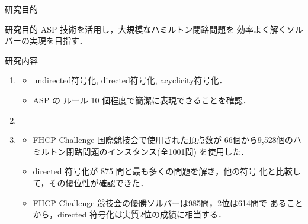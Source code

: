 \documentclass[dvipdfmx,10pt]{beamer}
\begin{document}
\begin{frame}{研究目的}
  \begin{alertblock}{研究目的}
  ASP 技術を活用し，大規模なハミルトン閉路問題を
    効率よく解くソルバーの実現を目指す．
  \end{alertblock}
  \begin{block}{研究内容}
    \begin{enumerate}
    \item {}
      \begin{itemize}
      \item \textsf{undirected}符号化, \textsf{directed}符号化, \textsf{acyclicity}符号化．
      \item ASP の \alert{ルール 10 個程度で簡潔に表現}できることを確認．
      \end{itemize}
    \item {}
    \item {}
      \begin{itemize}
        \item \alert{FHCP Challenge 国際競技会}で使用された頂点数が
          66個から9,528個のハミルトン閉路問題のインスタンス(全1001問)
          を使用した．
        \item directed 符号化が 875 問と最も多くの問題を解き，他の符号
          化と比較して，その優位性が確認できた．
        \item FHCP Challenge 競技会の優勝ソルバーは985問，2位は614問で
          あることから，directed 符号化は\alert{実質2位}の成績に相当する．
        \end{itemize}
    \end{enumerate}
  \end{block}
\end{frame}
\end{document}
